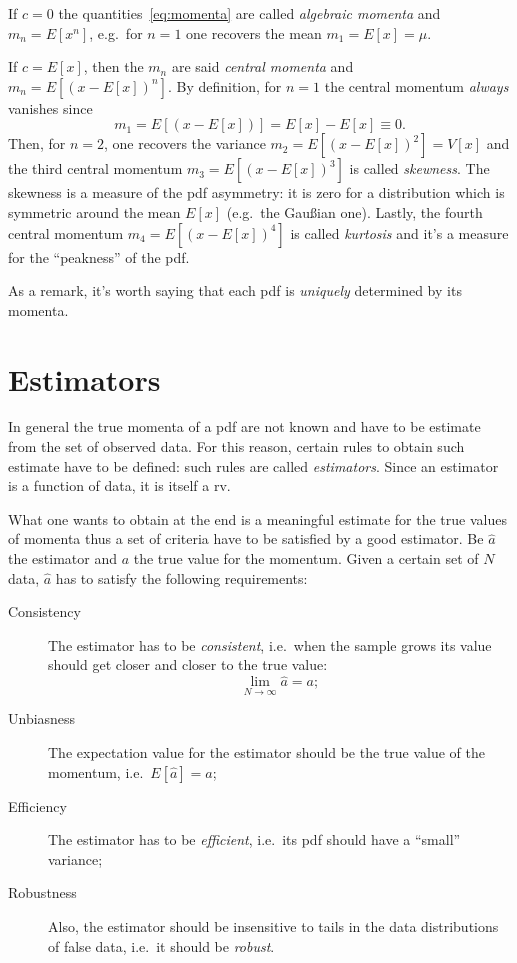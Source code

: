 \documentclass[
	10pt,
	draft
]{scrreprt}
\begin{document}
If $c=0$ the quantities~\eqref{eq:momenta} are called \emph{algebraic momenta} and $m_n = E[x^n]$, e.g.~for $n = 1$ one recovers the mean $m_1 = E[x] = \mu$.

If $c = E[x]$, then the $m_n$ are said \emph{central momenta}  and $m_n = E[(x-E[x])^n]$.
By definition, for $n=1$ the central momentum \emph{always} vanishes since
\begin{equation}
m_1 = E[(x-E[x])] = E[x]-E[x] \equiv 0.
\end{equation}
Then, for $n=2$, one recovers the variance $m_2 = E[(x-E[x])^2] = V[x]$ and the third central momentum $m_3 = E[(x-E[x])^3]$ is called \emph{skewness}.
The skewness is a measure of the \ac{pdf} asymmetry: it is zero for a distribution which is symmetric around the mean $E[x]$ (e.g.~the Gau\ss{}ian one).
Lastly, the fourth central momentum $m_4 = E[(x-E[x])^4]$ is called \emph{kurtosis} and it's a measure for the ``peakness'' of the \ac{pdf}.


As a remark, it's worth saying that each \ac{pdf} is \emph{uniquely} determined by its momenta.

		\section{Estimators}

In general the true momenta of a \ac{pdf} are not known and have to be estimate from the set of observed data.
For this reason, certain rules to obtain such estimate have to be defined: such rules are called \emph{estimators}.
Since an estimator is a function of data, it is itself a \ac{rv}.


What one wants to obtain at the end is a meaningful estimate for the true values of momenta thus a set of criteria have to be satisfied by a good estimator.
Be $\hat a$ the estimator and $a$ the true value for the momentum.
Given a certain set of $N$ data, $\hat a$ has to satisfy the following requirements:
\begin{description}
	\item[Consistency] The estimator has to be \emph{consistent}, i.e.~when the sample grows its value should get closer and closer to the true value:
\begin{equation}
\lim_{N\to\infty}\hat{a} = a;
\end{equation}

	\item[Unbiasness] The expectation value for the estimator should be the true value of the momentum, i.e.~$E[\hat a] = a$;

	\item[Efficiency] The estimator has to be \emph{efficient}, i.e.~its \ac{pdf} should have a ``small'' variance;

	\item[Robustness] Also, the estimator should be insensitive to tails in the data distributions of false data, i.e.~it should be \emph{robust}.

\end{description}
\end{document}
